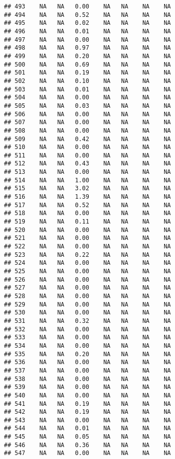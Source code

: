 \documentclass{article}\usepackage{graphicx, color}
\makeatletter
\newenvironment{kframe}{%
 \def\at@end@of@kframe{}%
 \ifinner\ifhmode%
  \def\at@end@of@kframe{\end{minipage}}%
  \begin{minipage}{\columnwidth}%
 \fi\fi%
 \def\FrameCommand##1{\hskip\@totalleftmargin \hskip-\fboxsep
 \colorbox{shadecolor}{##1}\hskip-\fboxsep
     \hskip-\linewidth \hskip-\@totalleftmargin \hskip\columnwidth}%
 \MakeFramed {\advance\hsize-\width
   \@totalleftmargin\z@ \linewidth\hsize
   \@setminipage}}%
 {\par\unskip\endMakeFramed%
 \at@end@of@kframe}
\newenvironment{knitrout}{}{} %
\makeatother
\begin{document}
\begin{knitrout}
\begin{kframe}
\begin{verbatim}
## 493    NA   NA   0.00    NA   NA    NA    NA
## 494    NA   NA   0.52    NA   NA    NA    NA
## 495    NA   NA   0.02    NA   NA    NA    NA
## 496    NA   NA   0.01    NA   NA    NA    NA
## 497    NA   NA   0.00    NA   NA    NA    NA
## 498    NA   NA   0.97    NA   NA    NA    NA
## 499    NA   NA   0.20    NA   NA    NA    NA
## 500    NA   NA   0.69    NA   NA    NA    NA
## 501    NA   NA   0.19    NA   NA    NA    NA
## 502    NA   NA   0.10    NA   NA    NA    NA
## 503    NA   NA   0.01    NA   NA    NA    NA
## 504    NA   NA   0.00    NA   NA    NA    NA
## 505    NA   NA   0.03    NA   NA    NA    NA
## 506    NA   NA   0.00    NA   NA    NA    NA
## 507    NA   NA   0.00    NA   NA    NA    NA
## 508    NA   NA   0.00    NA   NA    NA    NA
## 509    NA   NA   0.42    NA   NA    NA    NA
## 510    NA   NA   0.00    NA   NA    NA    NA
## 511    NA   NA   0.00    NA   NA    NA    NA
## 512    NA   NA   0.43    NA   NA    NA    NA
## 513    NA   NA   0.00    NA   NA    NA    NA
## 514    NA   NA   1.00    NA   NA    NA    NA
## 515    NA   NA   3.02    NA   NA    NA    NA
## 516    NA   NA   1.39    NA   NA    NA    NA
## 517    NA   NA   0.52    NA   NA    NA    NA
## 518    NA   NA   0.00    NA   NA    NA    NA
## 519    NA   NA   0.11    NA   NA    NA    NA
## 520    NA   NA   0.00    NA   NA    NA    NA
## 521    NA   NA   0.00    NA   NA    NA    NA
## 522    NA   NA   0.00    NA   NA    NA    NA
## 523    NA   NA   0.22    NA   NA    NA    NA
## 524    NA   NA   0.00    NA   NA    NA    NA
## 525    NA   NA   0.00    NA   NA    NA    NA
## 526    NA   NA   0.00    NA   NA    NA    NA
## 527    NA   NA   0.00    NA   NA    NA    NA
## 528    NA   NA   0.00    NA   NA    NA    NA
## 529    NA   NA   0.00    NA   NA    NA    NA
## 530    NA   NA   0.00    NA   NA    NA    NA
## 531    NA   NA   0.32    NA   NA    NA    NA
## 532    NA   NA   0.00    NA   NA    NA    NA
## 533    NA   NA   0.00    NA   NA    NA    NA
## 534    NA   NA   0.00    NA   NA    NA    NA
## 535    NA   NA   0.20    NA   NA    NA    NA
## 536    NA   NA   0.00    NA   NA    NA    NA
## 537    NA   NA   0.00    NA   NA    NA    NA
## 538    NA   NA   0.00    NA   NA    NA    NA
## 539    NA   NA   0.00    NA   NA    NA    NA
## 540    NA   NA   0.00    NA   NA    NA    NA
## 541    NA   NA   0.19    NA   NA    NA    NA
## 542    NA   NA   0.19    NA   NA    NA    NA
## 543    NA   NA   0.00    NA   NA    NA    NA
## 544    NA   NA   0.01    NA   NA    NA    NA
## 545    NA   NA   0.05    NA   NA    NA    NA
## 546    NA   NA   0.36    NA   NA    NA    NA
## 547    NA   NA   0.00    NA   NA    NA    NA

\end{verbatim}
\end{kframe}
\end{knitrout}
\end{document}
